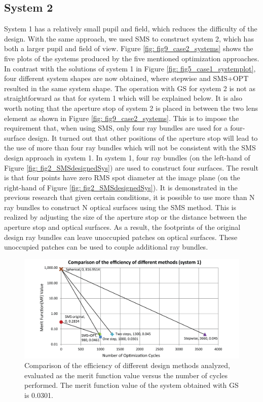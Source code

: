 \subsection{System 2}
System 1 has a relatively small pupil and field, which reduces the difficulty of the design. With the same approach, we used SMS to construct system 2, which has both a larger pupil and field of view. Figure \ref{fig: fig9_case2_systems} shows the five plots of the systems produced by the five mentioned optimization approaches. In contrast with the solutions of system 1 in Figure \ref{fig: fig5_case1_systemplot}, four different system shapes are now obtained, where stepwise and SMS+OPT resulted in the same system shape. The operation with GS for system 2 is not as straightforward as that for system 1 which will be explained below. It is also worth noting that the aperture stop of system 2 is placed in between the two lens element as shown in Figure \ref{fig: fig9_case2_systems}. This is to impose the requirement that, when using SMS, only four ray bundles are used for a four-surface design. It turned out that other positions of the aperture stop will lead to the use of more than four ray bundles which will not be consistent with the SMS design approach in system 1. In system 1, four ray bundles (on the left-hand of  Figure \ref{fig: fig2_SMSdesignedSys}) are used to construct four surfaces. The result is that four points have zero RMS spot diameter at the image plane (on the right-hand of Figure \ref{fig: fig2_SMSdesignedSys}). It is demonstrated in the previous research \cite{BenitezSPIE2014}\cite{FDuerrOE2013}\cite{FDuerrOE12} that given certain conditions, it is possible to use more than N ray bundles to construct N optical surfaces using the SMS method. This is realized by adjusting the size of the aperture stop or the distance between the aperture stop and optical surfaces. As a result, the footprints of the original design ray bundles can leave unoccupied patches on optical surfaces. These unoccupied patches can be used to couple additional ray bundles.   

\begin{figure}[h!]
    \centering
    \includegraphics[width=1\textwidth]{chapter-5/figures/Figure8_OE340147.png}
    \caption{Comparison of the efficiency of different design methods analyzed, evaluated as the merit function value versus the number of cycles performed. The merit function value of the system obtained with GS is 0.0301.}
    \label{fig: fig8_case1_efficiencyCompare}
\end{figure}

